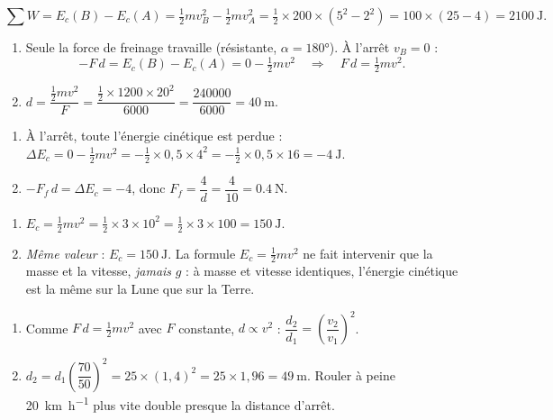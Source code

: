 \documentclass[11pt,a4paper]{article}
\begin{document}

\begin{corrige}
\[
\sum W=E_c(B)-E_c(A)=\tfrac12 m v_B^2-\tfrac12 m v_A^2=\tfrac12\times200\times(5^2-2^2)=100\times(25-4)=\qty{2100}{\joule}.
\]
\end{corrige}

\begin{corrige}
\begin{enumerate}[label=\alph*)]
  \item Seule la force de freinage travaille (résistante, $\alpha=\ang{180}$). À l'arrêt $v_B=0$ :
        \[
        -F\,d=E_c(B)-E_c(A)=0-\tfrac12 m v^2\quad\Longrightarrow\quad F\,d=\tfrac12 m v^2.
        \]
  \item $d=\dfrac{\tfrac12 m v^2}{F}=\dfrac{\tfrac12\times1200\times20^2}{6000}=\dfrac{240000}{6000}=\qty{40}{\metre}.$
\end{enumerate}
\end{corrige}

\begin{corrige}
\begin{enumerate}[label=\alph*)]
  \item À l'arrêt, toute l'énergie cinétique est perdue :
        $\Delta E_c=0-\tfrac12 m v^2=-\tfrac12\times0,5\times4^2=-\tfrac12\times0,5\times16=\qty{-4}{\joule}$.
  \item $-F_f\,d=\Delta E_c=-4$, donc $F_f=\dfrac{4}{d}=\dfrac{4}{10}=\qty{0,4}{\newton}$.
\end{enumerate}
\end{corrige}

\begin{corrige}
\begin{enumerate}[label=\alph*)]
  \item $E_c=\tfrac12 m v^2=\tfrac12\times3\times10^2=\tfrac12\times3\times100=\qty{150}{\joule}$.
  \item \emph{Même valeur} : $E_c=\qty{150}{\joule}$. La formule $E_c=\tfrac12 m v^2$ ne fait
        intervenir que la masse et la vitesse, \emph{jamais} $g$ : à masse et vitesse identiques,
        l'énergie cinétique est la même sur la Lune que sur la Terre.
\end{enumerate}
\end{corrige}

\begin{corrige}
\begin{enumerate}[label=\alph*)]
  \item Comme $F\,d=\tfrac12 m v^2$ avec $F$ constante, $d\propto v^2$ :
        $\dfrac{d_2}{d_1}=\left(\dfrac{v_2}{v_1}\right)^2$.
  \item $d_2=d_1\left(\dfrac{70}{50}\right)^2=25\times(1,4)^2=25\times1,96=\qty{49}{\metre}$.
        Rouler à peine \qty{20}{\kilo\metre\per\hour} plus vite double presque la distance d'arrêt.
\end{enumerate}
\end{corrige}
\end{document}
